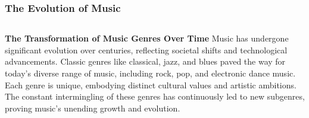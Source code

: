 \documentclass[5pt]{beamer}
\begin{document}
\begin{frame}
\frametitle{The Evolution of Music}
\begin{columns}
\begin{column}{0.7\textwidth}
\begin{block}{\textbf{The Transformation of Music Genres Over Time}}
Music has undergone significant evolution over centuries, reflecting societal shifts and technological advancements. Classic genres like classical, jazz, and blues paved the way for today's diverse range of music, including rock, pop, and electronic dance music. Each genre is unique, embodying distinct cultural values and artistic ambitions. The constant intermingling of these genres has continuously led to new subgenres, proving music's unending growth and evolution.
\end{block}
\end{column}
\end{columns}
\end{frame}
\end{document}
